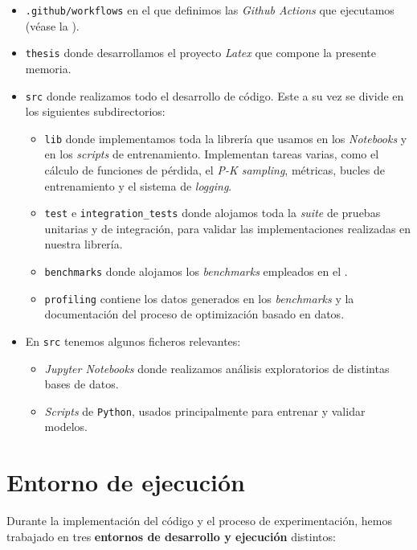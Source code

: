 \begin{itemize}
	\item \lstinline{.github/workflows} en el que definimos las \textit{Github Actions} que ejecutamos (véase la ).
	\item \lstinline{thesis} donde desarrollamos el proyecto \textit{Latex} que compone la presente memoria.
	\item \lstinline{src} donde realizamos todo el desarrollo de código. Este a su vez se divide en los siguientes subdirectorios:
	      \begin{itemize}
		      \item \lstinline{lib} donde implementamos toda la librería que usamos en los \textit{Notebooks} y en los \textit{scripts} de entrenamiento. Implementan tareas varias, como el cálculo de funciones de pérdida, el \textit{P-K sampling}, métricas, bucles de entrenamiento y el sistema de \textit{logging}.
		      \item \lstinline{test} e \lstinline{integration_tests} donde alojamos toda la \textit{suite} de pruebas unitarias y de integración, para validar las implementaciones realizadas en nuestra librería.
		      \item \lstinline{benchmarks} donde alojamos los \textit{benchmarks} empleados en el .
		      \item \lstinline{profiling} contiene los datos generados en los \textit{benchmarks} y la documentación del proceso de optimización basado en datos.
	      \end{itemize}
	\item En \lstinline{src} tenemos algunos ficheros relevantes:

	      \begin{itemize}
		      \item \textit{Jupyter Notebooks} donde realizamos análisis exploratorios de distintas bases de datos.
		      \item \textit{Scripts} de \lstinline{Python}, usados principalmente para entrenar y validar modelos.
	      \end{itemize}\end{itemize}

\section{Entorno de ejecución} \label{isec:entorno_ejecucion}

Durante la implementación del código y el proceso de experimentación, hemos trabajado en tres \textbf{entornos de desarrollo y ejecución} distintos:

